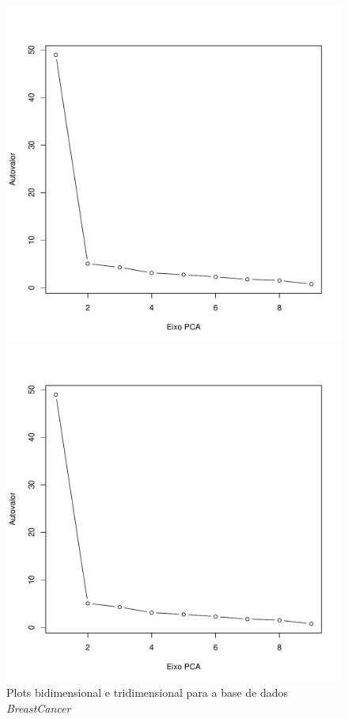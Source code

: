 \documentclass[a4paper]{article}
\begin{document}
\begin{figure}[H]
	\centering
	\begin{minipage}{.5\textwidth}
		\centering
		\includegraphics[page=2,width=\textwidth]{../breastCancer.pdf}
	\end{minipage}%
	\begin{minipage}{.5\textwidth}
		\centering
		\includegraphics[page=3,width=\textwidth]{../breastCancer.pdf}
	\end{minipage}
	\caption{Plots bidimensional e tridimensional para a base de dados \textit{BreastCancer}}
	\label{fig:breastCancerPlots}
\end{figure}
\end{document}
